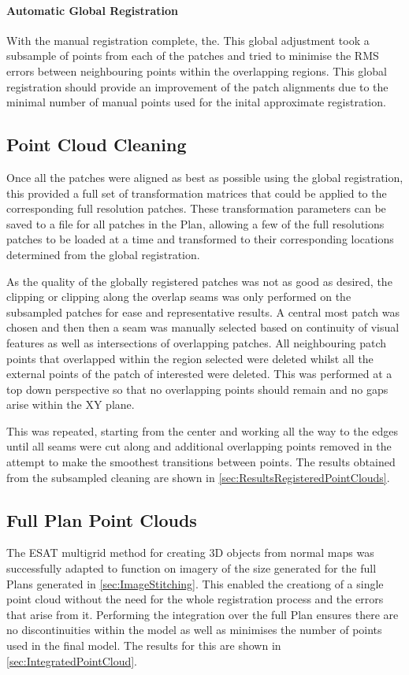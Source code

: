\paragraph{Automatic Global Registration}
With the manual registration complete, the. This global adjustment took a subsample of points from each of the patches and tried to minimise the RMS errors between neighbouring points within the overlapping regions. This global registration should provide an improvement of the patch alignments due to the minimal number of manual points used for the inital approximate registration.

\subsection{Point Cloud Cleaning}
\label{sec:PointCloudCleaning}
Once all the patches were aligned as best as possible using the global registration, this provided a full set of transformation matrices that could be applied to the corresponding full resolution patches. These transformation parameters can be saved to a file for all patches in the Plan, allowing a few of the full resolutions patches to be loaded at a time and transformed to their corresponding locations determined from the global registration.

As the quality of the globally registered patches was not as good as desired, the clipping or clipping along the overlap seams was only performed on the subsampled patches for ease and representative results. A central most patch was chosen and then then a seam was manually selected based on continuity of visual features as well as intersections of overlapping patches. All neighbouring patch points that overlapped within the region selected were deleted whilst all the external points of the patch of interested were deleted. This was performed at a top down perspective so that no overlapping points should remain and no gaps arise within the XY plane. 

This was repeated, starting from the center and working all the way to the edges until all seams were cut along and additional overlapping points removed in the attempt to make the smoothest transitions between points. The results obtained from the subsampled cleaning are shown in \cref{sec:ResultsRegisteredPointClouds}.

\subsection{Full Plan Point Clouds}
\label{sec:ResultsFullPlanPtClouds}
The ESAT multigrid method for creating 3D objects from normal maps was successfully adapted to function on imagery of the size generated for the full Plans generated in \cref{sec:ImageStitching}. This enabled the creationg of a single point cloud without the need for the whole registration process and the errors that arise from it. Performing the integration over the full Plan ensures there are no discontinuities within the model as well as minimises the number of points used in the final model. The results for this are shown in \cref{sec:IntegratedPointCloud}.

